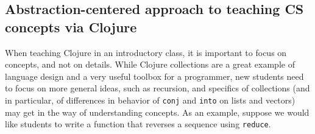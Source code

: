 \documentclass[submission,copyright,creativecommons]{eptcs}
\newcommand{\allcomments}[1]{{#1}}
\newcommand{\elenacomment}[1]{{\bf \textcolor{ForestGreen}{\allcomments{{#1}}}}}
\newcommand{\clocode}[1]{{\tt {#1}}}
\begin{document}
\subsection{Abstraction-centered approach to teaching CS concepts via Clojure}\label{subsec:abstraction}
When teaching Clojure in an introductory class, it is important to focus on concepts, and not on details. While Clojure collections are a great example of language design and a very useful toolbox for a programmer, new students need to focus on more general ideas, such as recursion, and specifics of collections (and in particular, of differences in behavior of \clocode{conj} and \clocode{into} on lists and vectors) may get in the way of understanding concepts. As an example, suppose we would like students to write a function that reverses a sequence using \clocode{reduce}. 





\end{document}
